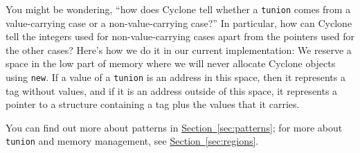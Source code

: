 You might be wondering, ``how does Cyclone tell whether a
\texttt{tunion} comes from a value-carrying case or a
non-value-carrying case?''  In particular, how can Cyclone tell the
integers used for non-value-carrying cases apart from the pointers
used for the other cases?  Here's how we do it in our current
implementation:  We reserve a space in the low part of memory where we
will never allocate Cyclone objects using \texttt{new}.  If a value of
a \texttt{tunion} is an address in this space, then it represents a
tag without values, and if it is an address outside of this space, it
represents a pointer to a structure containing a tag plus the values
that it carries.
  
You can find out more about patterns in
\hyperref[{sec:patterns}]{Section~\ref{sec:patterns}}; for more about
\texttt{tunion} and memory management, see
\hyperref[{sec:regions}]{Section~\ref{sec:regions}}.




